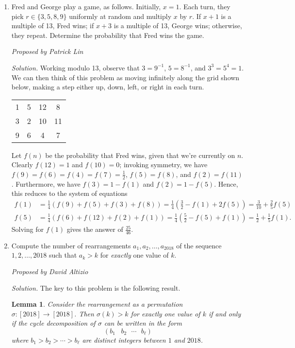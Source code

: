 \documentclass[10pt]{article}
\newtheorem{lemma}{Lemma}
\newcommand{\proposed}[1]
{
\vspace{5pt}
\noindent\textit{Proposed by #1}
}
\newcommand{\solution}
{
\vspace{5pt}
\noindent\textit{Solution.}\qquad
}
\begin{document}
\begin{enumerate}
\item Fred and George play a game, as follows. Initially, $x = 1$. Each turn, they pick $r \in \{3,5,8,9\}$ uniformly at random and multiply $x$ by $r$. If $x+1$ is a multiple of 13, Fred wins; if $x+3$ is a multiple of 13, George wins; otherwise, they repeat. Determine the probability that Fred wins the game.

\proposed{Patrick Lin}

\solution Working modulo 13, observe that $3 = 9^{-1}$, $5 = 8^{-1}$, and $3^3 = 5^4 = 1$. We can then think of this problem as moving infinitely along the grid shown below, making a step either up, down, left, or right in each turn.

\begin{table}[!h]
\centering
\begin{tabular}{|cccc|}
\hline
1 & 5 & 12 & 8  \\
3 & 2 & 10 & 11 \\
9 & 6 & 4  & 7  \\ \hline
\end{tabular}
\end{table}

Let $f(n)$ be the probability that Fred wins, given that we're currently on $n$. Clearly $f(12) = 1$ and $f(10) = 0$; invoking symmetry, we have $f(9) = f(6) = f(4) = f(7) = \frac12$, $f(5) = f(8)$, and $f(2) = f(11)$. Furthermore, we have $f(3) = 1 - f(1)$ and $f(2) = 1 - f(5)$. Hence, this reduces to the system of equations
\begin{align*}
f(1) & = \frac14\left(f(9) + f(5) + f(3) + f(8)\right) = \frac14\left(\frac32 - f(1) + 2f(5)\right) = \frac{3}{10} + \frac25 f(5) \\
f(5) & = \frac14\left(f(6) + f(12) + f(2) + f(1)\right) = \frac14\left(\frac52 - f(5) + f(1)\right) = \frac12 + \frac15 f(1).
\end{align*}
Solving for $f(1)$ gives the answer of $\boxed{\tfrac{25}{46}}$.


\item Compute the number of rearrangements $a_1, a_2, \dots, a_{2018}$ of the sequence $1, 2, \dots, 2018$ such that $a_k > k$ for \textit{exactly} one value of $k$.

\proposed{David Altizio}

\solution The key to this problem is the following result.

\begin{lemma}
Consider the rearrangement as a permutation $\sigma:[2018]\to[2018]$.  Then $\sigma(k) > k$ for exactly one value of $k$ if and only if the cycle decomposition of $\sigma$ can be written in the form \[(b_1\,\,\,\,\,b_2\,\,\,\,\cdots\,\,\,\,b_\ell)\] where $b_1>b_2>\cdots>b_\ell$ are distinct integers between $1$ and $2018$.
\end{lemma}


\end{enumerate}
\end{document}
